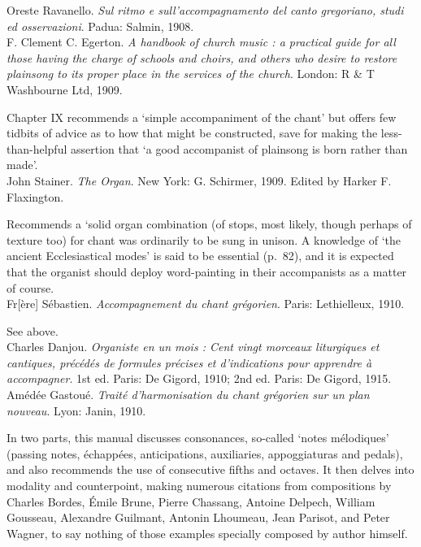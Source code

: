     \parindent=0pt
    \hangindent=0pt
  \covid{}Oreste Ravanello. \emph{Sul ritmo e sull'accompagnamento del canto gregoriano, studi ed osservazioni}. Padua:  Salmin, 1908. \\

    \parindent=0pt
    \hangindent=0pt
  F. Clement C. Egerton. \emph{A handbook of church music : a practical guide for all those having the charge of schools and choirs, and others who desire to restore plainsong to its proper place in the services of the church}. London:  R \& T Washbourne Ltd, 1909.

     \parindent=20pt
     \hangindent=20pt
     Chapter IX recommends a `simple accompaniment of the chant' but offers few tidbits of advice as to how that might be constructed, save for making the less-than-helpful assertion that `a good accompanist of plainsong is born rather than made'.\\

    \parindent=0pt
    \hangindent=0pt
  John Stainer. \emph{The Organ}. New York:  G. Schirmer, 1909. Edited by Harker F. Flaxington.

     \parindent=20pt
     \hangindent=20pt
     Recommends a `solid organ combination (of stops, most likely, though perhaps of texture too) for chant was ordinarily to be sung in unison. A knowledge of `the ancient Ecclesiastical modes' is said to be essential (p.~82), and it is expected that the organist should deploy word-painting in their accompanists as a matter of course.\\

    \parindent=0pt
    \hangindent=0pt
  Fr[ère] Sébastien. \emph{Accompagnement du chant grégorien}. Paris:  Lethielleux, 1910.

     \parindent=20pt
     \hangindent=20pt
     See \pageref{hl:frere_sebastien} above.\\

    \parindent=0pt
    \hangindent=0pt
  \covid{}Charles Danjou. \emph{Organiste en un mois : Cent vingt morceaux liturgiques et cantiques, précédés de formules précises et d'indications pour apprendre à accompagner}. 1st ed. Paris:  De Gigord, 1910;  2nd ed. Paris:  De Gigord, 1915. \\

    \parindent=0pt
    \hangindent=0pt
  Amédée Gastoué. \emph{Traité d'harmonisation du chant grégorien sur un plan nouveau}. Lyon:  Janin, 1910.

     \parindent=20pt
     \hangindent=20pt
     In two parts, this manual discusses consonances, so-called `notes mélodiques' (passing notes, échappées, anticipations, auxiliaries, appoggiaturas and pedals), and also recommends the use of consecutive fifths and octaves. It then delves into modality and counterpoint, making numerous citations from compositions by Charles Bordes, Émile Brune, Pierre Chassang, Antoine Delpech, William Gousseau, Alexandre Guilmant, Antonin Lhoumeau, Jean Parisot, and Peter Wagner, to say nothing of those examples specially composed by author himself.\\

